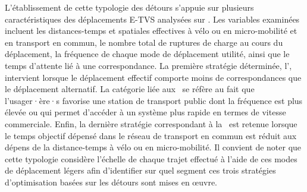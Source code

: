 \begin{refsegment}
L'établissement de cette typologie des détours s'appuie sur plusieurs caractéristiques des déplacements \acrshort{E-TVS} analysées sur . Les variables examinées incluent les distances-temps et spatiales effectives à vélo ou en micro-mobilité et en transport en commun, le nombre total de ruptures de charge au cours du déplacement, la fréquence de chaque mode de déplacement utilité, ainsi que le temps d'attente lié à une correspondance. La première stratégie déterminée, l', intervient lorsque le déplacement effectif comporte moins de correspondances que le déplacement alternatif. La catégorie liée aux ~se réfère au fait que l'usager·ère·s favorise une station de transport public dont la fréquence est plus élevée ou qui permet d'accéder à un système plus rapide en termes de vitesse commerciale. Enfin, la dernière stratégie correspondant à la ~est retenue lorsque le temps objectif dépensé dans le réseau de transport en commun est réduit aux dépens de la distance-temps à vélo ou en micro-mobilité. Il convient de noter que cette typologie considère l'échelle de chaque trajet effectué à l'aide de ces modes de déplacement légers afin d'identifier sur quel segment ces trois stratégies d'optimisation basées sur les détours sont mises en œuvre.%


\end{refsegment}
